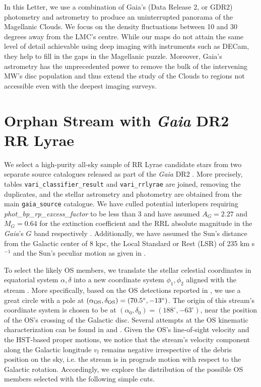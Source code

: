 \documentclass[a4paper,useAMS,usenatbib]{mnras}
\newcommand{\Gaia}{{\it Gaia}}
\newcommand{\gaia}{\textit{Gaia} }
\begin{document}
In this Letter, we use a combination of Gaia's (Data Release 2, or
GDR2) photometry and astrometry to produce an uninterrupted panorama
of the Magellanic Clouds. We focus on the density fluctuations between
10 and 30 degrees away from the LMC's centre. While our maps do not
attain the same level of detail achievable using deep imaging with
instruments such as DECam, they help to fill in the gaps in the
Magellanic puzzle. Moreover, Gaia's astrometry has the
unprecedented power to remove the bulk of the intervening MW's
disc population and thus extend the study of the Clouds to regions
not accessible even with the deepest imaging surveys.


\section{Orphan Stream with \gaia DR2 RR Lyrae}

We select a high-purity all-sky sample of RR Lyrae candidate stars
from two separate source catalogues released as part of the \gaia DR2
\citep[][]{Prusti2016, Brown2018}. More precisely, tables
\texttt{vari\_classifier\_result} and \texttt{vari\_rrlyrae}
\citep[see][]{Clementini2018,Holl2018} are joined, removing the
duplicates, and the stellar astrometry and photometry are obtained
from the main \texttt{gaia\_source} catalogue. We have culled
potential interlopers requiring \textit{phot\_bp\_rp\_excess\_factor}
to be less than 3 and have assumed $A_G=2.27$ and $M_G=0.64$ for the
extinction coefficient and the RRL absolute magnitude in the \Gaia's
$G$ band respectively \citep[see][for further
  details]{Iorio2018}. Additionally, we have assumed the Sun's
distance from the Galactic center of 8 kpc, the Local Standard or Rest
(LSR) of 235 km s$^{-1}$ and the Sun's peculiar motion as given in
\citet{LSR}.

To select the likely OS members, we translate the stellar celestial
coordinates in equatorial system $\alpha, \delta$ into a new
coordinate system $\phi_1, \phi_2$ aligned with the stream \citep[see
  e.g.][]{Koposov2010}. More specifically, based on the OS detections
reported in \citet{OS_V, OS_C, Newberg2010}, we use a great circle
with a pole at $(\alpha_{\rm OS}, \delta_{\rm OS})=(70.5^{\circ},
-13^{\circ})$. The origin of this stream's coordinate system is chosen
to be at $(\alpha_0, \delta_0)=(188^{\circ}, -63^{\circ})$, near the
position of the OS's crossing of the Galactic disc. Several attempts
at the OS kinematic characterization can be found in
\citet{Newberg2010} and \citet{Sohn2016}. Given the OS's line-of-sight
velocity and the HST-based proper motions, we notice that the stream's
velocity component along the Galactic longitude $v_l$ remains negative
irrespective of the debris position on the sky, i.e. the stream is in
prograde motion with respect to the Galactic rotation. Accordingly, we
explore the distribution of the possible OS members selected with the
following simple cuts.
\end{document}
